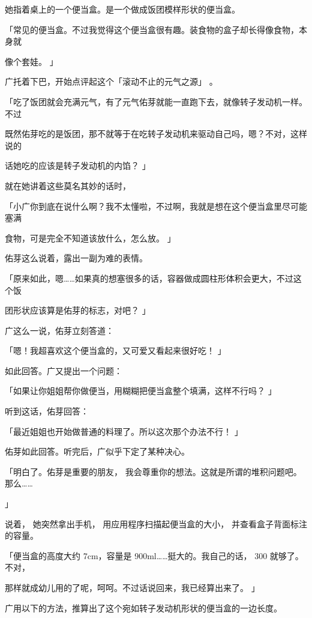 她指着桌上的一个便当盒。是一个做成饭团模样形状的便当盒。\par
「常见的便当盒。不过我觉得这个便当盒很有趣。装食物的盒子却长得像食物，本身就\par
像个套娃。 」\par
广托着下巴，开始点评起这个「滚动不止的元气之源」 。\par
「吃了饭团就会充满元气，有了元气佑芽就能一直跑下去，就像转子发动机一样。不过\par
既然佑芽吃的是饭团，那不就等于在吃转子发动机来驱动自己吗，嗯？不对，这样说的\par
话她吃的应该是转子发动机的内馅？ 」\par
就在她讲着这些莫名其妙的话时，\par
「小广你到底在说什么啊？我不太懂啦，不过啊，我就是想在这个便当盒里尽可能塞满\par
食物，可是完全不知道该放什么，怎么放。 」\par
佑芽这么说着，露出一副为难的表情。\par
「原来如此，嗯……如果真的想塞很多的话，容器做成圆柱形体积会更大，不过这个饭\par
团形状应该算是佑芽的标志，对吧？ 」\par
广这么一说，佑芽立刻答道：\par
「嗯！我超喜欢这个便当盒的，又可爱又看起来很好吃！ 」\par
如此回答。广又提出一个问题：\par
「如果让你姐姐帮你做便当，用糊糊把便当盒整个填满，这样不行吗？ 」\par
听到这话，佑芽回答：\par
「最近姐姐也开始做普通的料理了。所以这次那个办法不行！ 」\par
佑芽如此回答。听完后，广似乎下定了某种决心。\par
「明白了。佑芽是重要的朋友， 我会尊重你的想法。这就是所谓的堆积问题吧。那么……\par
」\par
说着， 她突然拿出手机， 用应用程序扫描起便当盒的大小， 并查看盒子背面标注的容量。\par
「便当盒的高度大约 7cm，容量是 900ml……挺大的。我自己的话， 300 就够了。不对，\par
那样就成幼儿用的了呢，呵呵。不过话说回来，我已经算出来了。 」\par
广用以下的方法，推算出了这个宛如转子发动机形状的便当盒的一边长度。\par

